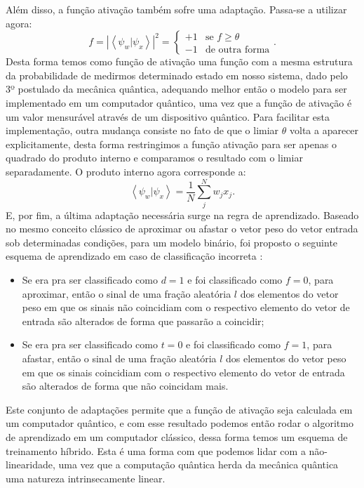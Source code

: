  Além disso, a função ativação também sofre uma adaptação. Passa-se a utilizar agora:
\begin{equation}               
f=\left|\left\langle \psi_{w}|\psi_{x}\right\rangle \right|^{2}=\left\{ \begin{array}{cc}
+1 & \text{se }f\geq  \theta \\
-1 & \text{de outra forma}
\end{array}\right.
. \end{equation}
Desta forma temos como função de ativação uma função com a mesma estrutura da probabilidade de medirmos determinado estado em nosso sistema, dado pelo 3º postulado da mecânica quântica, adequando melhor então o modelo para ser implementado em um computador quântico, uma vez que a função de ativação é um valor mensurável através de um dispositivo quântico. Para facilitar esta implementação, outra mudança consiste no fato de que o limiar $\theta$ volta a aparecer explicitamente, desta forma restringimos a função ativação para ser apenas o quadrado do produto interno e comparamos o resultado com o limiar separadamente. O produto interno agora corresponde a:
\begin{equation}
\left\langle \psi_{w}|\psi_{x}\right\rangle =\frac{1}{N}\sum_{j}^{N}w_{j}x_{j}
. \end{equation}E, por fim, a última adaptação necessária surge na regra de aprendizado. Baseado no mesmo conceito clássico de aproximar ou afastar  o vetor peso do vetor entrada sob determinadas condições, para um modelo binário, foi proposto o seguinte esquema de aprendizado em caso de classificação incorreta \cite{Italiano}:
 \begin{itemize}
 \item  Se era pra ser classificado como $d=1$ e foi classificado como $f=0$, para aproximar, então o sinal de uma fração aleatória $l$ dos elementos do vetor peso em que os sinais não coincidiam com o respectivo elemento do vetor de entrada são alterados de forma que passarão a coincidir;
 	\item Se era pra ser classificado como $t=0$ e foi classificado como $f=1$, para afastar, então o sinal de uma fração aleatória $l$ dos elementos do vetor peso em que os sinais coincidiam com o respectivo elemento do vetor de entrada são alterados de forma que não coincidam mais.
\end{itemize}

Este conjunto de adaptações permite  que a função de ativação seja calculada em um computador quântico, e com esse resultado podemos então rodar o algoritmo de aprendizado em um computador clássico, dessa forma temos um esquema de treinamento híbrido.  Esta é uma forma com que podemos lidar com a  não-linearidade, uma vez que a computação quântica herda da mecânica quântica uma natureza intrinsecamente linear. 

